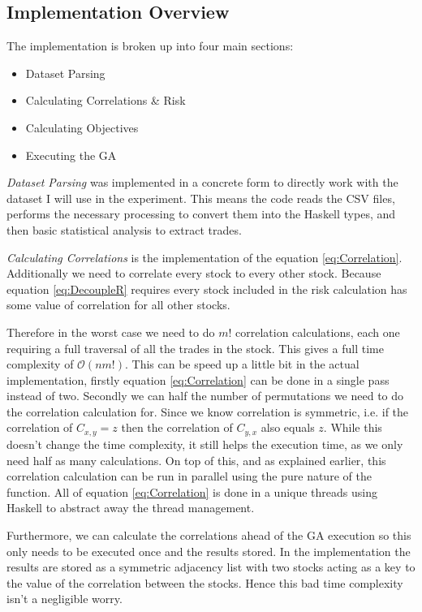 \documentclass[11pt]{article}
\newcommand{\bigO}{\mathcal{O}}
\begin{document}
\subsection{Implementation Overview}

    The implementation is broken up into four main sections:

    \begin{itemize}
        \item{Dataset Parsing}
        \item{Calculating Correlations \& Risk}
        \item{Calculating Objectives}
        \item{Executing the GA}
    \end{itemize}

    \textit{Dataset Parsing} was implemented in a concrete form to directly work with the
    dataset I will use in the experiment. This means the code reads the CSV files,
    performs the necessary processing to convert them into the Haskell types, and then
    basic statistical analysis to extract trades.

    \textit{Calculating Correlations} is the implementation of the equation \ref{eq:Correlation}.
    Additionally we need to correlate every stock to every other stock. Because equation
    \ref{eq:DecoupleR} requires every stock included in the risk calculation has some value of
    correlation for all other stocks.

    Therefore in the worst case we need to do \(m!\) correlation calculations, each one requiring a
    full traversal of all the trades in the stock. This gives a full time complexity of 
    \(\bigO (nm!) \). This can be speed up a little bit in the actual implementation, firstly
    equation \ref{eq:Correlation} can be done in a single pass instead of two. Secondly we can
    half the number of permutations we need to do the correlation calculation for. Since we know
    correlation is symmetric, i.e. if the correlation of \(C_{x,y} = z\) then the correlation
    of \(C_{y,x}\) also equals \(z\). While this doesn't change the time complexity, it still helps
    the execution time, as we only need half as many calculations. On top of this, and as explained
    earlier, this correlation calculation can be run in parallel using the pure nature of the function.
    All of equation \ref{eq:Correlation} is done in a unique threads using Haskell to abstract away
    the thread management.

    Furthermore, we can calculate the correlations ahead of the GA execution so this only needs to be
    executed once and the results stored. In the implementation the results are stored as a symmetric
    adjacency list with two stocks acting as a key to the value of the correlation between the stocks.
    Hence this bad time complexity isn't a negligible worry.
\end{document}
